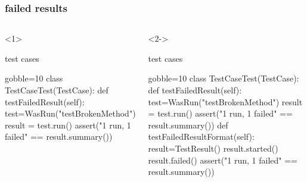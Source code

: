 \documentclass[lualatex]{beamer}
\begin{document}
\begin{frame}[fragile,t]
  \frametitle{failed results}

  \begin{columns}[t]
    \small
    \begin{onlyenv}<1>
      \begin{block}{test cases}
        \begin{pythoncode*}{gobble=10}
          class TestCaseTest(TestCase):
            def testFailedResult(self):
              test=WasRun("testBrokenMethod")
              result = test.run()
              assert("1 run, 1 failed"
                == result.summary())
        \end{pythoncode*}
      \end{block}
    \end{onlyenv}
    \begin{onlyenv}<2->
      \begin{block}{test cases}
        \begin{pythoncode*}{gobble=10}
          class TestCaseTest(TestCase):
            def testFailedResult(self):
              test=WasRun("testBrokenMethod")
              result = test.run()
              assert("1 run, 1 failed"
                == result.summary())
            def testFailedResultFormat(self):
              result=TestResult()
              result.started()
              result.failed()
              assert("1 run, 1 failed"
                == result.summary())
        \end{pythoncode*}
      \end{block}
    \end{onlyenv}


\end{columns}
\end{frame}
\end{document}

